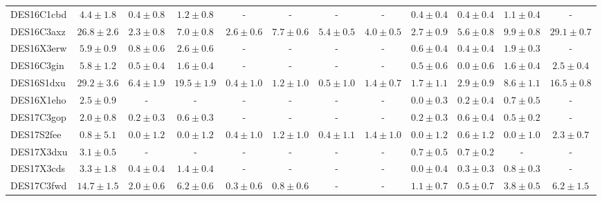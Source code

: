 \documentclass[fleqn,usenatbib,]{mnras}
\begin{document}
\begin{table}
\begin{tabular}{lccccccccccc}
DES16C1cbd  &    $4.4 \pm 1.8$ &  $0.4 \pm 0.8$ &   $1.2 \pm 0.8$ &              - &               - &              - &              - &  $0.4 \pm 0.4$ &   $0.4 \pm 0.4$ &   $1.1 \pm 0.4$ &               - \\
DES16C3axz  &   $26.8 \pm 2.6$ &  $2.3 \pm 0.8$ &   $7.0 \pm 0.8$ &  $2.6 \pm 0.6$ &   $7.7 \pm 0.6$ &  $5.4 \pm 0.5$ &  $4.0 \pm 0.5$ &  $2.7 \pm 0.9$ &   $5.6 \pm 0.8$ &   $9.9 \pm 0.8$ &  $29.1 \pm 0.7$ \\
DES16X3erw  &    $5.9 \pm 0.9$ &  $0.8 \pm 0.6$ &   $2.6 \pm 0.6$ &              - &               - &              - &              - &  $0.6 \pm 0.4$ &   $0.4 \pm 0.4$ &   $1.9 \pm 0.3$ &               - \\
DES16C3gin  &    $5.8 \pm 1.2$ &  $0.5 \pm 0.4$ &   $1.6 \pm 0.4$ &              - &               - &              - &              - &  $0.5 \pm 0.6$ &   $0.0 \pm 0.6$ &   $1.6 \pm 0.4$ &   $2.5 \pm 0.4$ \\
DES16S1dxu  &   $29.2 \pm 3.6$ &  $6.4 \pm 1.9$ &  $19.5 \pm 1.9$ &  $0.4 \pm 1.0$ &   $1.2 \pm 1.0$ &  $0.5 \pm 1.0$ &  $1.4 \pm 0.7$ &  $1.7 \pm 1.1$ &   $2.9 \pm 0.9$ &   $8.6 \pm 1.1$ &  $16.5 \pm 0.8$ \\
DES16X1eho  &    $2.5 \pm 0.9$ &              - &               - &              - &               - &              - &              - &  $0.0 \pm 0.3$ &   $0.2 \pm 0.4$ &   $0.7 \pm 0.5$ &               - \\
DES17C3gop  &    $2.0 \pm 0.8$ &  $0.2 \pm 0.3$ &   $0.6 \pm 0.3$ &              - &               - &              - &              - &  $0.2 \pm 0.3$ &   $0.6 \pm 0.4$ &   $0.5 \pm 0.2$ &               - \\
DES17S2fee  &    $0.8 \pm 5.1$ &  $0.0 \pm 1.2$ &   $0.0 \pm 1.2$ &  $0.4 \pm 1.0$ &   $1.2 \pm 1.0$ &  $0.4 \pm 1.1$ &  $1.4 \pm 1.0$ &  $0.0 \pm 1.2$ &   $0.6 \pm 1.2$ &   $0.0 \pm 1.0$ &   $2.3 \pm 0.7$ \\
DES17X3dxu  &    $3.1 \pm 0.5$ &              - &               - &              - &               - &              - &              - &  $0.7 \pm 0.5$ &   $0.7 \pm 0.2$ &               - &               - \\
DES17X3cds  &    $3.3 \pm 1.8$ &  $0.4 \pm 0.4$ &   $1.4 \pm 0.4$ &              - &               - &              - &              - &  $0.0 \pm 0.4$ &   $0.3 \pm 0.3$ &   $0.8 \pm 0.3$ &               - \\
DES17C3fwd  &   $14.7 \pm 1.5$ &  $2.0 \pm 0.6$ &   $6.2 \pm 0.6$ &  $0.3 \pm 0.6$ &   $0.8 \pm 0.6$ &              - &              - &  $1.1 \pm 0.7$ &   $0.5 \pm 0.7$ &   $3.8 \pm 0.5$ &   $6.2 \pm 1.5$ \\

\end{tabular}
\end{table}
\end{document}
